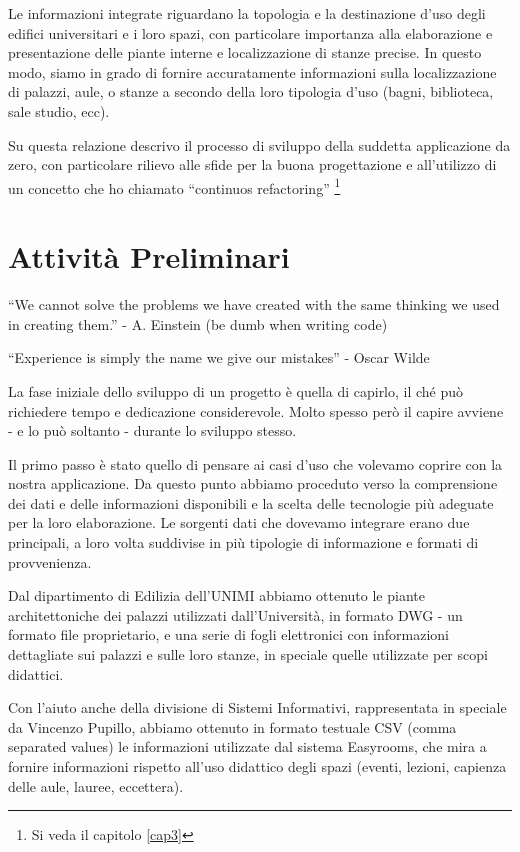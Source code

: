 \documentclass[12pt]{report}
\begin{document}
Le informazioni integrate riguardano la topologia e la destinazione d'uso degli edifici universitari e i loro spazi, con particolare importanza alla elaborazione e presentazione delle piante interne e localizzazione di stanze precise. In questo modo, siamo in grado di fornire accuratamente informazioni sulla localizzazione di palazzi, aule, o stanze a secondo della loro tipologia d'uso (bagni, biblioteca, sale studio, ecc).

Su questa relazione descrivo il processo di sviluppo della suddetta applicazione da zero, con particolare rilievo alle sfide per la buona progettazione e all’utilizzo di un concetto che ho chiamato “continuos refactoring” \footnote{Si veda il capitolo \ref{cap3}}


% 
% 
\chapter{Attività Preliminari}
\label{cap2}
``We cannot solve the problems we have created
with the same thinking we used in creating them.'' - A. Einstein (be dumb when writing code)

``Experience is simply the name we give our mistakes'' - Oscar Wilde

La fase iniziale dello sviluppo di un progetto è quella di capirlo, il ché può richiedere tempo e dedicazione considerevole. Molto spesso però il capire avviene - e lo può soltanto - durante lo sviluppo stesso.

Il primo passo è stato quello di pensare ai casi d'uso che volevamo coprire con la nostra applicazione. Da questo punto abbiamo proceduto verso la comprensione dei dati e delle informazioni disponibili e la scelta delle tecnologie più adeguate per la loro elaborazione. Le sorgenti dati che dovevamo integrare erano due principali, a loro volta suddivise in più tipologie di informazione e formati di provvenienza.

Dal dipartimento di Edilizia dell'UNIMI abbiamo ottenuto le piante architettoniche dei palazzi utilizzati dall'Università, in formato DWG - un formato file proprietario, e una serie di fogli elettronici con informazioni dettagliate sui palazzi e sulle loro stanze, in speciale quelle utilizzate per scopi didattici.

Con l'aiuto anche della divisione di Sistemi Informativi, rappresentata in speciale da Vincenzo Pupillo, abbiamo ottenuto in formato testuale CSV (comma separated values) le informazioni utilizzate dal sistema Easyrooms, che mira a fornire informazioni rispetto all'uso didattico degli spazi (eventi, lezioni, capienza delle aule, lauree, eccettera).
\end{document}
